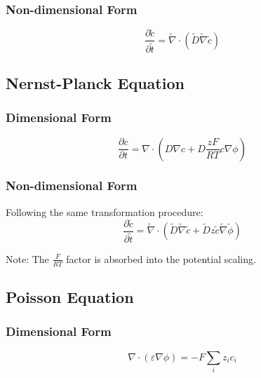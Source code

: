 \documentclass[11pt,a4paper]{article}
\newcommand{\tildevar}[1]{\tilde{#1}}
\begin{document}
\subsubsection{Non-dimensional Form}
\begin{equation}
\frac{\partial \tildevar{c}}{\partial \tildevar{t}} = \tildevar{\nabla} \cdot (\tildevar{D} \tildevar{\nabla} \tildevar{c})
\label{eq:diffusion_nondim}
\end{equation}

\subsection{Nernst-Planck Equation}

\subsubsection{Dimensional Form}
\begin{equation}
\frac{\partial c}{\partial t} = \nabla \cdot \left( D \nabla c + D \frac{zF}{RT} c \nabla \phi \right)
\label{eq:nernst_planck_dim}
\end{equation}

\subsubsection{Non-dimensional Form}

Following the same transformation procedure:
\begin{equation}
\frac{\partial \tildevar{c}}{\partial \tildevar{t}} = \tildevar{\nabla} \cdot \left( \tildevar{D} \tildevar{\nabla} \tildevar{c} + \tildevar{D} z \tildevar{c} \tildevar{\nabla} \tildevar{\phi} \right)
\label{eq:nernst_planck_nondim}
\end{equation}

Note: The $\frac{F}{RT}$ factor is absorbed into the potential scaling.

\subsection{Poisson Equation}

\subsubsection{Dimensional Form}
\begin{equation}
\nabla \cdot (\varepsilon \nabla \phi) = -F \sum_i z_i c_i
\label{eq:poisson_dim}
\end{equation}
\end{document}
